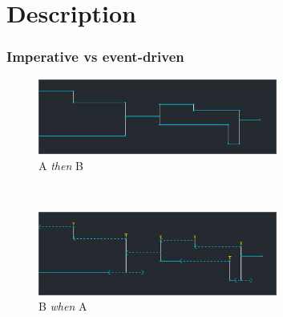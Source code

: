 \documentclass{beamer}
\begin{document}
\section{Description}
\begin{frame}
    \Huge
\end{frame}    
\begin{frame}[plain]
\end{frame}

\begin{frame}
    \frametitle{Imperative vs event-driven}
    \begin{figure}
        \includegraphics[width=0.7\textwidth]{images/procedural.png}
        \caption{A \emph{then} B}
    \end{figure}~\\
    \begin{figure}
        \includegraphics[width=0.7\textwidth]{images/event.png}
        \caption{B \emph{when} A}
    \end{figure}
\end{frame}
\end{document}
